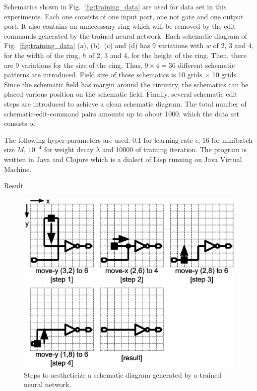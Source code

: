 \documentclass[twocolumn]{article}
\makeatletter
\def\section{\@startsection {section}{1}{\z@}{20pt plus 2pt minus 2pt}
{8pt plus 2pt minus 2pt}{\centering\normalsize\sc
\edef\@svsec{\thesection.\ }}}
\def\thesection{\Roman{section}}
\makeatother
\begin{document}
Schematics shown in Fig.\ \ref{fig:training_data} are used for data set
in this experiments.
Each one consists of one input port, one not gate and one output port.
It also contains an unnecessary ring which will be removed
by the edit commands generated by the trained neural network.
Each schematic diagram of Fig.\ \ref{fig:training_data} (a), (b), (c) and (d)
has 9 variations with
$w$ of 2, 3 and 4, for the width of the ring,
$h$ of 2, 3 and 4, for the height of the ring.
Then, there are 9 variations for the size of the ring.
Thus, $9 \times 4 = 36$ different schematic patterns are introduced.
Field size of those schematics is 10 grids $\times$ 10 grids.
Since the schematic field has margin around the circuitry,
the schematics can be placed various position on the schematic field.
Finally, several schematic edit steps are introduced
to achieve a clean schematic diagram.
The total number of schematic-edit-command pairs amounts up to about 1000,
which the data set consists of.

The following hyper-parameters are used:
0.1 for learning rate $\epsilon$,
16 for minibatch size $M$,
$10^{-4}$ for weight decay $\lambda$ and 10000 of training iteration.
The program is written in Java and Clojure which is
a dialect of Lisp running on Java Virtual Machine.

\section{Result}

\begin{figure}[!tp]
 \begin{center}
  \begin{minipage}{\hsize}
   \includegraphics[width=\hsize]{fig/edit_steps_04.eps}
   \caption{Steps to aestheticize a schematic diagram
            generated by a trained neural network.}
   \label{fig:edit_steps}
  \end{minipage}
 \end{center}
\end{figure}
\end{document}
